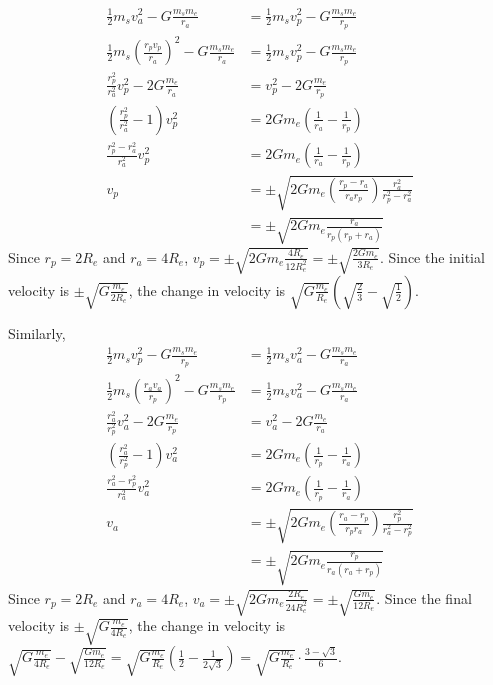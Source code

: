 \documentclass{esg8012pset}
\begin{document}
\begin{solution}
\begin{solution}
\begin{enumerate}[(a)]
\begin{align*}
 \frac{1}{2} m_s v_a^2 - G\frac{m_s m_e}{r_a} & = \frac{1}{2} m_s v_p^2 - G\frac{m_s m_e}{r_p} \\
 \frac{1}{2} m_s \left(\frac{r_p v_p}{r_a}\right)^2 - G\frac{m_s m_e}{r_a} & = \frac{1}{2} m_s v_p^2 - G\frac{m_s m_e}{r_p} \\
 \frac{r_p^2}{r_a^2} v_p^2 - 2G\frac{m_e}{r_a} & = v_p^2 - 2G\frac{m_e}{r_p} \\
 \left(\frac{r_p^2}{r_a^2} - 1\right) v_p^2 & = 2Gm_e\left(\frac{1}{r_a} - \frac{1}{r_p}\right) \\
 \frac{r_p^2 - r_a^2}{r_a^2} v_p^2  & = 2Gm_e\left(\frac{1}{r_a} - \frac{1}{r_p}\right) \\
 v_p  & = \pm\sqrt{2Gm_e\left(\frac{r_p - r_a}{r_a r_p}\right)\frac{r_a^2}{r_p^2 - r_a^2}} \\
   & = \pm\sqrt{2Gm_e\frac{r_a}{r_p(r_p + r_a)}}
\end{align*}  Since $r_p = 2R_e$ and $r_a = 4R_e$, $v_p = \pm\sqrt{2Gm_e\frac{4R_e}{12R_e^2}} = \pm\sqrt{\frac{2G m_e}{3R_e}}$.  Since the initial velocity is $\pm \sqrt{G\frac{m_e}{2R_e}}$, the change in velocity is $\sqrt{G\frac{m_e}{R_e}}\left(\sqrt{\frac{2}{3}} - \sqrt{\frac{1}{2}}\right)$. \par
Similarly, \begin{align*}
 \frac{1}{2} m_s v_p^2 - G\frac{m_s m_e}{r_p} & = \frac{1}{2} m_s v_a^2 - G\frac{m_s m_e}{r_a} \\
 \frac{1}{2} m_s \left(\frac{r_a v_a}{r_p}\right)^2 - G\frac{m_s m_e}{r_p} & = \frac{1}{2} m_s v_a^2 - G\frac{m_s m_e}{r_a} \\
 \frac{r_a^2}{r_p^2} v_a^2 - 2G\frac{m_e}{r_p} & = v_a^2 - 2G\frac{m_e}{r_a} \\
 \left(\frac{r_a^2}{r_p^2} - 1\right) v_a^2 & = 2Gm_e\left(\frac{1}{r_p} - \frac{1}{r_a}\right) \\
 \frac{r_a^2 - r_p^2}{r_a^2} v_a^2  & = 2Gm_e\left(\frac{1}{r_p} - \frac{1}{r_a}\right) \\
 v_a  & = \pm\sqrt{2Gm_e\left(\frac{r_a - r_p}{r_p r_a}\right)\frac{r_p^2}{r_a^2 - r_p^2}} \\
   & = \pm\sqrt{2Gm_e\frac{r_p}{r_a(r_a + r_p)}}
\end{align*}  Since $r_p = 2R_e$ and $r_a = 4R_e$, $v_a = \pm\sqrt{2Gm_e\frac{2R_e}{24R_e^2}} = \pm\sqrt{\frac{G m_e}{12R_e}}$.  Since the final velocity is $\pm \sqrt{G\frac{m_e}{4R_e}}$, the change in velocity is $\sqrt{G\frac{m_e}{4R_e}} - \sqrt{\frac{G m_e}{12R_e}} = \sqrt{G\frac{m_e}{R_e}}\left(\frac{1}{2} - \frac{1}{2\sqrt{3}}\right) = \sqrt{G\frac{m_e}{R_e}}\cdot \frac{3 - \sqrt{3}}{6}$.
\end{enumerate}
\end{solution}



\end{solution}
\end{document}
